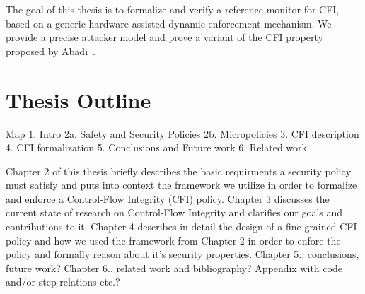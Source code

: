 The goal of this thesis is to formalize and verify a reference monitor
for CFI, based on a generic hardware-assisted dynamic enforcement
mechanism.
We provide a precise attacker model and prove a variant of the CFI property
proposed by Abadi~\ETAL\cite{abadi2005}.

\section{Thesis Outline}\label{sec:outline}
Map
1. Intro
2a. Safety and Security Policies
2b. Micropolicies
3. CFI description
4. CFI formalization
5. Conclusions and Future work
6. Related work

Chapter 2 of this thesis briefly describes the basic requirments a security
policy must satisfy and puts into context the framework we utilize in order
to formalize and enforce a Control-Flow Integrity (CFI) policy.
Chapter 3 discusses the current state of research on Control-Flow Integrity 
and clarifies our goals and contributions to it.
Chapter 4 describes in detail the design of a fine-grained CFI policy and
how we used the framework from Chapter 2 in order to enfore the policy
and formally reason about it's security properties.
Chapter 5.. conclusions, future work?
Chapter 6.. related work and bibliography?
Appendix with code and/or step relations etc.?
